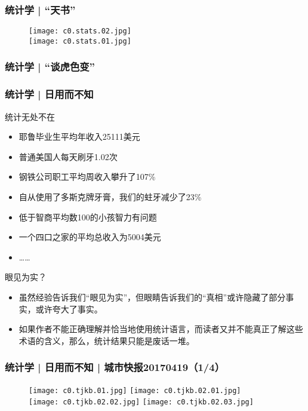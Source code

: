 \begin{frame}
  \frametitle{统计学 | “天书”}
  \begin{figure}
    \centering
    \texttt{[image: c0.stats.02.jpg]}\\
    \texttt{[image: c0.stats.01.jpg]}
  \end{figure}
\end{frame}

\begin{frame}
  \frametitle{统计学 | “谈虎色变”}
  \begin{figure}
    \centering
  \end{figure}
\end{frame}

\begin{frame}[fragile]
  \frametitle{统计学 | 日用而不知}
  \begin{block}{统计无处不在}
    \begin{itemize}
      \item 耶鲁毕业生平均年收入25111美元 
      \item 普通美国人每天刷牙1.02次
      \item 钢铁公司职工平均周收入攀升了107\%
      \item 自从使用了多斯克牌牙膏，我们的蛀牙减少了23\%
      \item 低于智商平均数100的小孩智力有问题
      \item 一个四口之家的平均总收入为5004美元
      \item ……
    \end{itemize}
  \end{block}
  \pause
  \begin{block}{眼见为实？}
    \begin{itemize}
      \item 虽然经验告诉我们“眼见为实”，但眼睛告诉我们的“真相”或许隐藏了部分事实，或许夸大了事实。
      \item 如果作者不能正确理解并恰当地使用统计语言，而读者又并不能真正了解这些术语的含义，那么，统计结果只能是废话一堆。
    \end{itemize}
  \end{block}
\end{frame}

\begin{frame}
  \frametitle{统计学 | 日用而不知 | 城市快报20170419（1/4）}
  \begin{figure}
    \centering
    \texttt{[image: c0.tjkb.01.jpg]}\quad
    \texttt{[image: c0.tjkb.02.01.jpg]}\\
    \texttt{[image: c0.tjkb.02.02.jpg]}\quad
    \texttt{[image: c0.tjkb.02.03.jpg]}\\
  \end{figure}
\end{frame}

